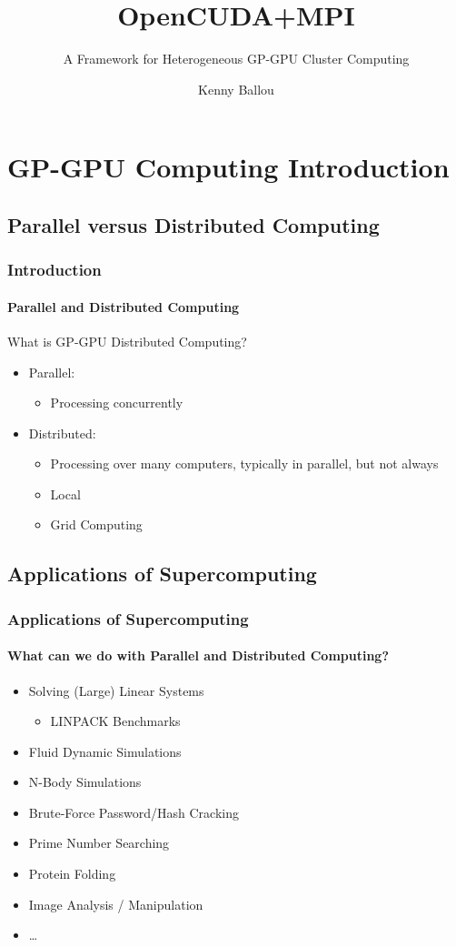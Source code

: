 \documentclass{beamer}
\title{OpenCUDA+MPI}
\subtitle{A Framework for Heterogeneous GP-GPU Cluster Computing}
\author[Ballou]{Kenny Ballou}
\begin{document}
\begin{frame}[label=titleslide]
\titlepage
\end{frame}
\begin{frame}
\tableofcontents[subsectionstyle=hide]
\end{frame}
\section{GP-GPU Computing Introduction}
\subsection{Parallel versus Distributed Computing}
\begin{frame}
\frametitle{Introduction}
\framesubtitle{Parallel and Distributed Computing}
What is GP-GPU Distributed Computing?
\begin{itemize}
\item{Parallel:}
\begin{itemize}
\item{Processing concurrently}
\end{itemize}
\item{Distributed:}
\begin{itemize}
\item{Processing over many computers, typically in parallel, but not always}
\item{Local}
\item{Grid Computing}
\end{itemize}
\end{itemize}
\end{frame}
\subsection{Applications of Supercomputing}
\begin{frame}
\frametitle{Applications of Supercomputing}
\framesubtitle{What can we do with Parallel and Distributed Computing?}
\begin{itemize}
\item{Solving (Large) Linear Systems}
\begin{itemize}
\item{LINPACK Benchmarks}
\end{itemize}
\item{Fluid Dynamic Simulations}
\item{N-Body Simulations}
\item{Brute-Force Password/Hash Cracking}
\item{Prime Number Searching}
\item{Protein Folding}
\item{Image Analysis / Manipulation}
\item{\dots{}}
\end{itemize}
\end{frame}
\end{document}
